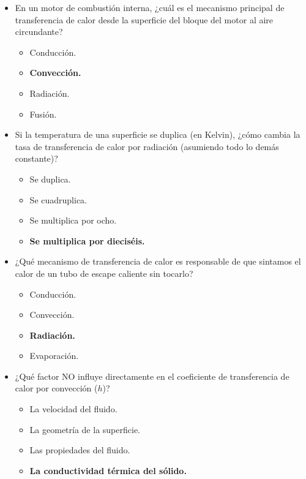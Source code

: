 \documentclass{article}
\begin{document}
\begin{enumerate}[label=\arabic*.]
\begin{itemize}[label=\alph*)]
    \item En un motor de combustión interna, ¿cuál es el mecanismo principal de transferencia de calor desde la superficie del bloque del motor al aire circundante?
    \begin{itemize}[label=\alph*)]
        \item Conducción.
        \item \textbf{Convección.}
        \item Radiación.
        \item Fusión.
    \end{itemize}

    \item Si la temperatura de una superficie se duplica (en Kelvin), ¿cómo cambia la tasa de transferencia de calor por radiación (asumiendo todo lo demás constante)?
    \begin{itemize}[label=\alph*)]
        \item Se duplica.
        \item Se cuadruplica.
        \item Se multiplica por ocho.
        \item \textbf{Se multiplica por dieciséis.}
    \end{itemize}

    \item ¿Qué mecanismo de transferencia de calor es responsable de que sintamos el calor de un tubo de escape caliente sin tocarlo?
    \begin{itemize}[label=\alph*)]
        \item Conducción.
        \item Convección.
        \item \textbf{Radiación.}
        \item Evaporación.
    \end{itemize}

    \item ¿Qué factor NO influye directamente en el coeficiente de transferencia de calor por convección ($h$)?
    \begin{itemize}[label=\alph*)]
        \item La velocidad del fluido.
        \item La geometría de la superficie.
        \item Las propiedades del fluido.
        \item \textbf{La conductividad térmica del sólido.}
    \end{itemize}


\end{itemize}
\end{enumerate}
\end{document}
